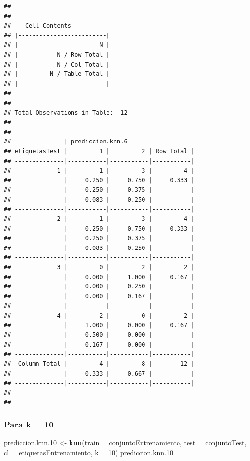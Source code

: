 \documentclass[]{article}
\newenvironment{Shaded}{\begin{snugshade}}{\end{snugshade}}
\newcommand{\KeywordTok}[1]{\textcolor[rgb]{0.13,0.29,0.53}{\textbf{#1}}}
\newcommand{\DataTypeTok}[1]{\textcolor[rgb]{0.13,0.29,0.53}{#1}}
\newcommand{\DecValTok}[1]{\textcolor[rgb]{0.00,0.00,0.81}{#1}}
\newcommand{\StringTok}[1]{\textcolor[rgb]{0.31,0.60,0.02}{#1}}
\newcommand{\NormalTok}[1]{#1}
\begin{document}
\begin{verbatim}
## 
##  
##    Cell Contents
## |-------------------------|
## |                       N |
## |           N / Row Total |
## |           N / Col Total |
## |         N / Table Total |
## |-------------------------|
## 
##  
## Total Observations in Table:  12 
## 
##  
##               | prediccion.knn.6 
## etiquetasTest |         1 |         2 | Row Total | 
## --------------|-----------|-----------|-----------|
##             1 |         1 |         3 |         4 | 
##               |     0.250 |     0.750 |     0.333 | 
##               |     0.250 |     0.375 |           | 
##               |     0.083 |     0.250 |           | 
## --------------|-----------|-----------|-----------|
##             2 |         1 |         3 |         4 | 
##               |     0.250 |     0.750 |     0.333 | 
##               |     0.250 |     0.375 |           | 
##               |     0.083 |     0.250 |           | 
## --------------|-----------|-----------|-----------|
##             3 |         0 |         2 |         2 | 
##               |     0.000 |     1.000 |     0.167 | 
##               |     0.000 |     0.250 |           | 
##               |     0.000 |     0.167 |           | 
## --------------|-----------|-----------|-----------|
##             4 |         2 |         0 |         2 | 
##               |     1.000 |     0.000 |     0.167 | 
##               |     0.500 |     0.000 |           | 
##               |     0.167 |     0.000 |           | 
## --------------|-----------|-----------|-----------|
##  Column Total |         4 |         8 |        12 | 
##               |     0.333 |     0.667 |           | 
## --------------|-----------|-----------|-----------|
## 
## 
\end{verbatim}

\subsubsection{Para k = 10}\label{para-k-10}

\begin{Shaded}
\begin{Highlighting}[]
\NormalTok{prediccion.knn.}\DecValTok{10}\NormalTok{ <-}\StringTok{ }\KeywordTok{knn}\NormalTok{(}\DataTypeTok{train =}\NormalTok{ conjuntoEntrenamiento, }\DataTypeTok{test =}\NormalTok{ conjuntoTest, }\DataTypeTok{cl =}\NormalTok{ etiquetasEntrenamiento, }\DataTypeTok{k =} \DecValTok{10}\NormalTok{)}
\NormalTok{prediccion.knn.}\DecValTok{10}
\end{Highlighting}
\end{Shaded}
\end{document}
